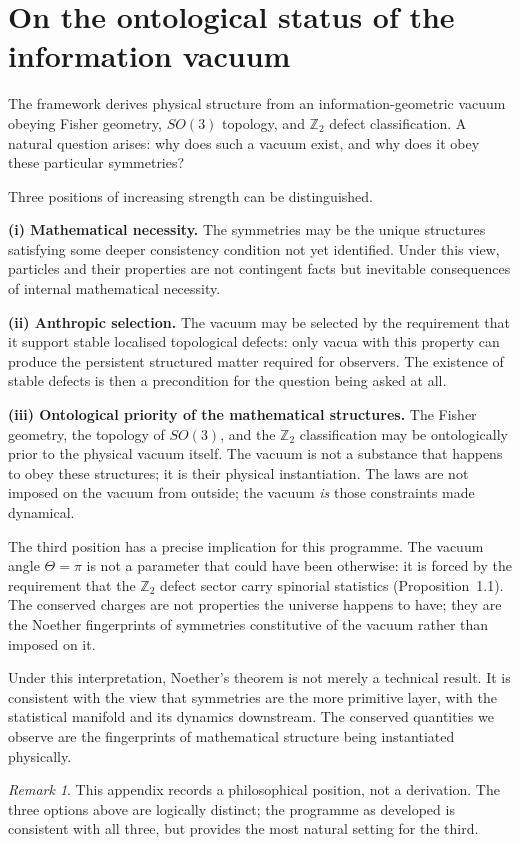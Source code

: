 \documentclass[12pt]{article}
\theoremstyle{definition}
\theoremstyle{remark}
\newtheorem{remark}[theorem]{Remark}
\begin{document}
\section{On the ontological status of the information vacuum}
\label{app:onto}

The framework derives physical structure from an information-geometric
vacuum obeying Fisher geometry, $SO(3)$ topology, and $\mathbb{Z}_2$ defect
classification.  A natural question arises: why does such a vacuum exist,
and why does it obey these particular symmetries?

Three positions of increasing strength can be distinguished.

\textbf{(i) Mathematical necessity.}  The symmetries may be the unique
structures satisfying some deeper consistency condition not yet identified.
Under this view, particles and their properties are not contingent facts but
inevitable consequences of internal mathematical necessity.

\textbf{(ii) Anthropic selection.}  The vacuum may be selected by the
requirement that it support stable localised topological defects: only vacua
with this property can produce the persistent structured matter required for
observers.  The existence of stable defects is then a precondition for the
question being asked at all.

\textbf{(iii) Ontological priority of the mathematical structures.}
The Fisher geometry, the topology of $SO(3)$, and the $\mathbb{Z}_2$
classification may be ontologically prior to the physical vacuum itself.
The vacuum is not a substance that happens to obey these structures; it is
their physical instantiation.  The laws are not imposed on the vacuum from
outside; the vacuum \emph{is} those constraints made dynamical.

The third position has a precise implication for this programme.  The vacuum
angle $\Theta=\pi$ is not a parameter that could have been otherwise: it is
forced by the requirement that the $\mathbb{Z}_2$ defect sector carry
spinorial statistics (Proposition~1.1).  The conserved charges are not
properties the universe happens to have; they are the Noether fingerprints
of symmetries constitutive of the vacuum rather than imposed on it.

Under this interpretation, Noether's theorem is not merely a technical
result.  It is consistent with the view that symmetries are the more primitive
layer, with the statistical manifold and its dynamics downstream.  The
conserved quantities we observe are the fingerprints of mathematical structure
being instantiated physically.

\begin{remark}
This appendix records a philosophical position, not a derivation.
The three options above are logically distinct; the programme as developed
is consistent with all three, but provides the most natural setting for the
third.
\end{remark}
\end{document}
